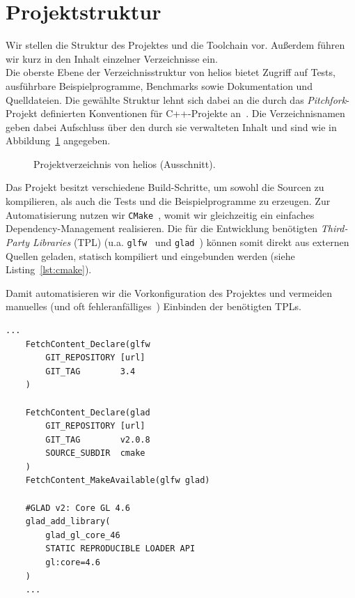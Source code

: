 \section{Projektstruktur}
Wir stellen die Struktur des Projektes und die Toolchain vor.
Außerdem führen wir kurz in den Inhalt einzelner Verzeichnisse ein.\\

Die oberste Ebene der Verzeichnisstruktur von helios bietet Zugriff auf Tests, ausführbare Beispielprogramme, Benchmarks sowie Dokumentation und Quelldateien.
Die gewählte Struktur lehnt sich dabei an die durch das \textit{Pitchfork}-Projekt definierten Konventionen für C++-Projekte an~\cite[]{Pitchfork}.
Die Verzeichnisnamen geben dabei Aufschluss über den durch sie verwalteten Inhalt und sind wie in Abbildung~\ref{fig:verzeichnisstruktur} angegeben.\par

\begin{figure}[htbp]
    \setlength{\DTbaselineskip}{18pt}
    \caption{Projektverzeichnis von helios (Ausschnitt).}
    \label{fig:verzeichnisstruktur}
\end{figure}

Das Projekt besitzt verschiedene Build-Schritte, um sowohl die Sourcen zu kompilieren, als auch die Tests und die Beispielprogramme zu erzeugen.
Zur Automatisierung nutzen wir \texttt{CMake}~\cite[]{CMake}, womit wir gleichzeitig ein einfaches Dependency-Management realisieren.
Die für die Entwicklung benötigten \textit{Third-Party Libraries} (TPL) (u.a. \texttt{glfw}~\cite[]{glfwHomepage} und \texttt{glad}~\cite[]{gladgithub}) können somit direkt aus externen Quellen geladen, statisch kompiliert und eingebunden werden (siehe Listing~\ref{lst:cmake}).\par

Damit automatisieren wir die Vorkonfiguration des Projektes und vermeiden manuelles (und oft fehleranfälliges~\cite[]{FG22}) Einbinden der benötigten TPLs.

\begin{lstlisting}[style=c++style, caption={Ausschnitt aus der CMakeLists.txt von helios: Dieser Abschnitt deklariert und bezieht GLFW v3.4 und GLAD v2.0.8 per FetchContent von den jeweiligen Github-Repositories (URLs der Übersicht halber ausgelassen). Im Anschluss wird ein GLAD-Loader für OpenGL 4.6 als statische Bibliothek erzeugt.}, label=lst:cmake]
    ...
    FetchContent_Declare(glfw
        GIT_REPOSITORY [url]
        GIT_TAG        3.4
    )

    FetchContent_Declare(glad
        GIT_REPOSITORY [url]
        GIT_TAG        v2.0.8
        SOURCE_SUBDIR  cmake
    )
    FetchContent_MakeAvailable(glfw glad)

    #GLAD v2: Core GL 4.6
    glad_add_library(
        glad_gl_core_46
        STATIC REPRODUCIBLE LOADER API
        gl:core=4.6
    )
    ...
\end{lstlisting}


